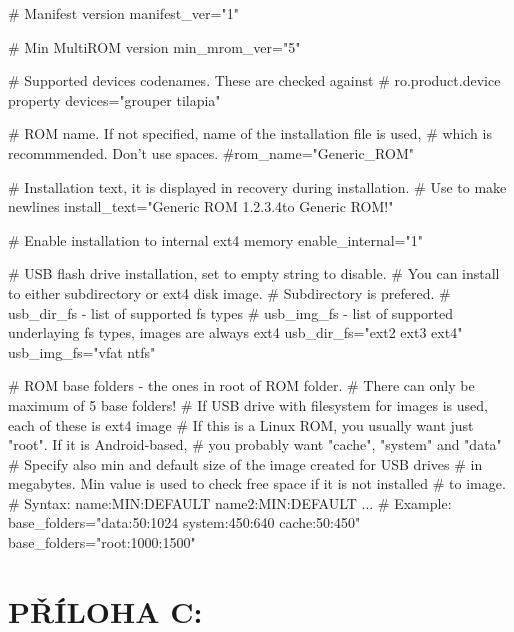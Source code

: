 \documentclass[12pt, a4paper, oneside]{article}
\begin{document}
\linespread{1.1}
\begin{listing}[H]
\begin{inicode}
# Manifest version
manifest_ver="1"

# Min MultiROM version
min_mrom_ver="5"

# Supported devices codenames. These are checked against
# ro.product.device property
devices="grouper tilapia"

# ROM name. If not specified, name of the installation file is used,
# which is recommmended. Don't use spaces.
#rom_name="Generic_ROM"

# Installation text, it is displayed in recovery during installation.
# Use \n to make newlines
install_text="Generic ROM 1.2.3.4\nWelcome to Generic ROM!\n\n"

# Enable installation to internal ext4 memory
enable_internal="1"

# USB flash drive installation, set to empty string to disable.
# You can install to either subdirectory or ext4 disk image.
# Subdirectory is prefered.
# usb_dir_fs - list of supported fs types
# usb_img_fs - list of supported underlaying fs types, images are always ext4
usb_dir_fs="ext2 ext3 ext4"
usb_img_fs="vfat ntfs"

# ROM base folders - the ones in root of ROM folder.
# There can only be maximum of 5 base folders!
# If USB drive with filesystem for images is used, each of these is ext4 image
# If this is a Linux ROM, you usually want just "root". If it is Android-based,
# you probably want "cache", "system" and "data"
# Specify also min and default size of the image created for USB drives
# in megabytes. Min value is used to check free space if it is not installed
# to image.
# Syntax: name:MIN:DEFAULT name2:MIN:DEFAULT ...
# Example: base_folders="data:50:1024 system:450:640 cache:50:450"
base_folders="root:1000:1500"
\end{inicode}
\caption{Obsah souboru \verb-manifest.txt- s~komentáři}
\label{manifest-txt}
\end{listing}

\linespread{1.3}


\newpage
\section*{PŘÍLOHA C:}
\end{document}
